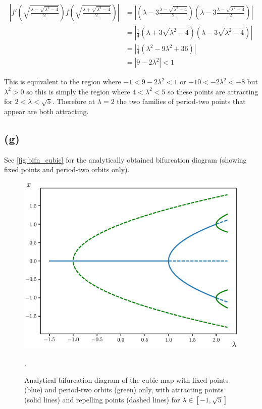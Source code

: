 \documentclass{article}
\begin{document}
\begin{align*}
    \left|f'\left(\sqrt{\frac{\lambda - \sqrt{\lambda^2 - 4}}{2}}\right)f\left(\sqrt{\frac{\lambda + \sqrt{\lambda^2 - 4}}{2}}\right)\right| &= \left|\left(\lambda - 3\frac{\lambda - \sqrt{\lambda^2-4}}{2}\right)\left(\lambda - 3\frac{\lambda - \sqrt{\lambda^2-4}}{2}\right)\right| \\
    &= \left|\frac{1}{4}(\lambda + 3\sqrt{\lambda^2 -4})(\lambda - 3\sqrt{\lambda^2 -4}) \right| \\
    &= \left|\frac{1}{4}(\lambda^2 - 9\lambda^2 + 36)\right| \\
    &= |9 - 2\lambda^2| < 1
\end{align*}

This is equivalent to the region where $-1 < 9 - 2\lambda^2 < 1$ or $-10 < -2\lambda^2 < -8$ 
but $\lambda^2 > 0$  so this is simply the region where $4 < \lambda^2 < 5$ so these points are 
attracting for $2 < \lambda < \sqrt{5}$. Therefore at $\lambda = 2$ the two families of period-two points that 
appear are both attracting.

\subsection*{(g)}
See \autoref{fig:bifn_cubic} for the analytically obtained bifurcation diagram (showing fixed points and period-two 
orbits only).

\begin{figure}[H]
    \centering
    \includegraphics[scale = 0.8]{Figure_12.eps}
	\caption{Analytical bifurcation diagram of the cubic map with fixed points (blue) and 
    period-two orbits (green) only, with attracting points (solid lines) and repelling 
    points (dashed lines) for $\lambda \in [-1,\sqrt{5}]$}.
    \label{fig:bifn_cubic}
\end{figure}
\end{document}
